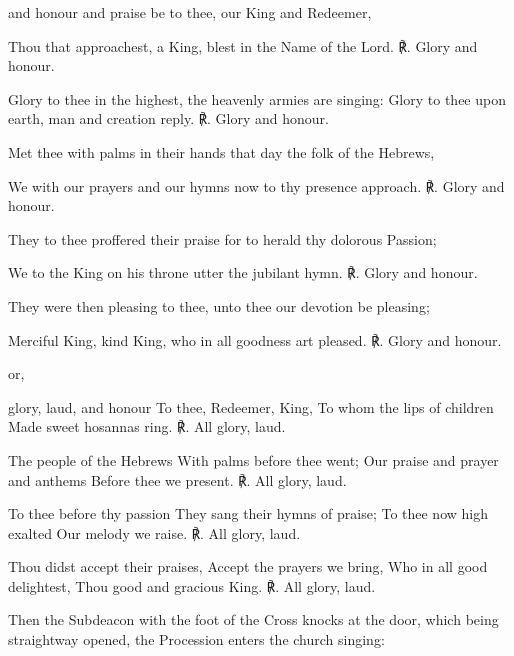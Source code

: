  and honour and praise be to thee, our King and Redeemer,\par
{}
Thou that approachest, a King, blest in the Name of the Lord. ℟. Glory and honour.\par
Glory to thee in the highest, the heavenly armies are singing: Glory to thee upon earth, man and creation reply. ℟. Glory and honour.\par
Met thee with palms in their hands that day the folk of the Hebrews,\par
We with our prayers and our hymns now to thy presence approach. ℟. Glory and honour.\par
They to thee proffered their praise for to herald thy dolorous Passion;\par
We to the King on his throne utter the jubilant hymn. ℟. Glory and honour.\par
They were then pleasing to thee, unto thee our devotion be pleasing;\par
Merciful King, kind King, who in all goodness art pleased. ℟. Glory and honour.\par
\begin{inhead}
    or,
\end{inhead}
 glory, laud, and honour To thee, Redeemer, King, To whom the lips of children Made sweet hosannas ring. ℟. All glory, laud.\par
{}
The people of the Hebrews With palms before thee went; Our praise and prayer and anthems Before thee we present. ℟. All glory, laud.\par
To thee before thy passion They sang their hymns of praise; To thee now high exalted Our melody we raise. ℟. All glory, laud.\par
Thou didst accept their praises, Accept the prayers we bring, Who in all good delightest, Thou good and gracious King. ℟. All glory, laud.\par
\begin{rubric}
    Then the Subdeacon with the foot of the Cross knocks at the door, which being straightway opened, the Procession enters the church singing:
\end{rubric}\par
